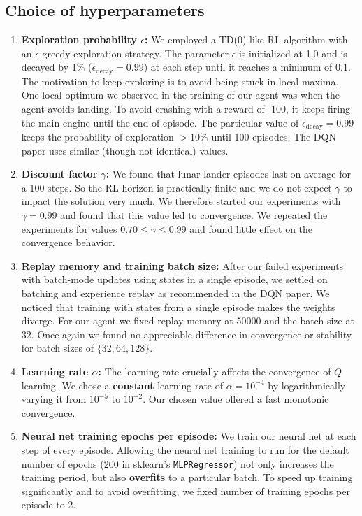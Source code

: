 \documentclass[conference]{IEEEtran}
\begin{document}
\subsection{Choice of hyperparameters}
\begin{enumerate}
\item
{\bf Exploration probability $\epsilon$:} We employed a TD(0)-like RL algorithm with an $\epsilon$-greedy exploration strategy. The parameter $\epsilon$ is initialized at 1.0 and is decayed by 1\% ($\epsilon_{\text{decay}} = 0.99$) at each step until it reaches a minimum of 0.1. The motivation to keep exploring is to avoid being stuck in local maxima. One local optimum we observed in the training of our agent was when the agent avoids landing. To avoid crashing with a reward of -100, it keeps firing the main engine until the end of episode. The particular value of $\epsilon_{\text{decay}} = 0.99$ keeps the probability of exploration $>10\%$ until 100 episodes. The DQN paper uses similar (though not identical) values.

\item
{\bf Discount factor $\gamma$:} We found that lunar lander episodes last on average for a 100 steps. So the RL horizon is practically finite and we do not expect $\gamma$ to impact the solution very much. We therefore started our experiments with $\gamma=0.99$ and found that this value led to convergence. We repeated the experiments for values $0.70\leq \gamma \leq 0.99$ and found little effect on the convergence behavior.

\item
{\bf Replay memory and training batch size:} After our failed experiments with batch-mode updates using states in a single episode, we settled on batching and experience replay as recommended in the DQN paper. We noticed that training with states from a single episode makes the weights diverge. For our agent we fixed replay memory at 50000 and the batch size at 32. Once again we found no appreciable difference in convergence or stability for batch sizes of $\{32, 64, 128\}$.
 
\item 
{\bf Learning rate $\alpha$:} The learning rate crucially affects the convergence of $Q$ learning. We chose a {\bf constant} learning rate of $\alpha = 10^{-4}$ by logarithmically varying it from $10^{-5}$ to $10^{-2}$. Our chosen value offered a fast monotonic convergence.

\item 
{\bf Neural net training epochs per episode:} We train our neural net at each step of every episode. Allowing the neural net training to run for the default number of  epochs (200 in sklearn's {\tt MLPRegressor}) not only increases the training period, but also {\bf overfits} to a particular batch. To speed up training significantly and to avoid overfitting, we fixed number of training epochs per episode to 2. 
\end{enumerate}
\end{document}
